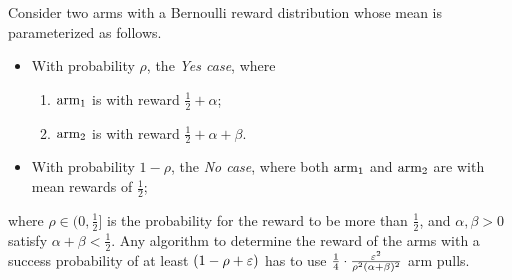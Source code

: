 \begin{lemma}
	\label{lem:arm-identify}
	Consider two arms with a Bernoulli reward distribution whose mean is parameterized as follows.
	\begin{itemize}
		\item With probability $\rho$, the \emph{Yes case}, where
		\begin{enumerate}[label=\roman*).]
			\item $\textnormal{arm}_{1}$ is with reward $\frac{1}{2}+\alpha$;
			\item $\textnormal{arm}_{2}$ is with reward $\frac{1}{2}+\alpha+\beta$.
		\end{enumerate}
		\item With probability $1-\rho$, the \emph{No case}, where both $\textnormal{arm}_{1}$ and $\textnormal{arm}_{2}$ are with mean rewards of $\frac{1}{2}$;
	\end{itemize}
	where $\rho\in (0,\frac{1}{2}]$ is the probability for the reward to be more than $\frac{1}{2}$, and $\alpha, \beta >0$ satisfy $\alpha+\beta<\frac{1}{2}$. Any algorithm to determine the reward of the arms with a success probability of at least $(1-\rho+\varepsilon)$ has to use $\frac{1}{4}\cdot \frac{\varepsilon^2}{\rho^2 (\alpha+\beta)^{2}}$ arm pulls.
\end{lemma}
